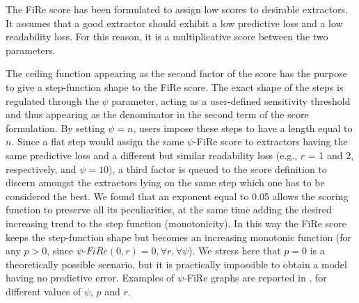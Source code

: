 \documentclass{article}
\newcommand{\fire}{FiRe}
\newcommand{\psifire}{$\psi$-\fire}
\begin{document}
The \fire{} score has been formulated to assign low scores to desirable extractors.
%
It assumes that a good extractor should exhibit a low predictive loss and a low readability loss.
%
For this reason, it is a multiplicative score between the two parameters.

The ceiling function appearing as the second factor of the score has the purpose to give a step-function shape to the \fire{} score.
%
The exact shape of the steps is regulated through the $\psi$ parameter, acting as a user-defined sensitivity threshold and thus appearing as the denominator in the second term of the score formulation.
%
By setting $\psi=n$, users impose these steps to have a length equal to $n$.
%
Since a flat step would assign the same \psifire{} score to extractors having the same predictive loss and a different but similar readability loss (e.g., $r$ = 1 and 2, respectively, and $\psi=10$), a third factor is queued to the score definition to discern amongst the extractors lying on the same step which one has to be considered the best.
%
We found that an exponent equal to 0.05 allows the scoring function to preserve all its peculiarities, at the same time adding the desired increasing trend to the step function (monotonicity).
%
In this way the \fire{} score keeps the step-function shape but becomes an increasing monotonic function (for any $p>0$, since $\psi\textrm{-}\fire{}(0, r)=0, \forall r, \forall \psi$).
%
We stress here that $p=0$ is a theoretically possible scenario, but it is practically impossible to obtain a model having no predictive error.
%
Examples of \psifire{} graphs are reported in , for different values of $\psi$, $p$ and $r$.

\end{document}
